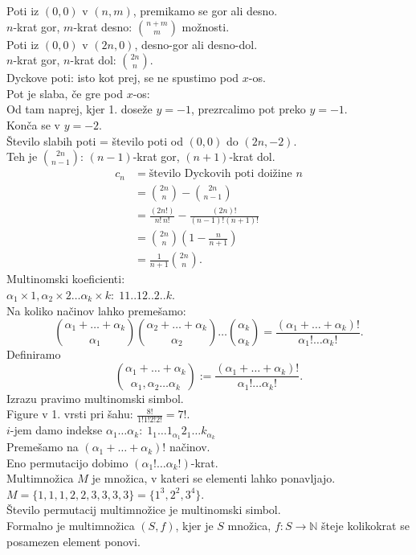 \documentclass[a4paper, 12pt]{book}
\theoremstyle{definition}
\theoremstyle{remark}
\newcommand{\N}{\mathbb{N}}
\begin{document}
Poti iz $(0,0)$ v $(n,m)$, premikamo se gor ali desno. \\
$n$-krat gor, $m$-krat desno: $\binom{n+m}{m}$ možnosti. \\
Poti iz $(0,0)$ v $(2n,0)$, desno-gor ali desno-dol. \\
$n$-krat gor, $n$-krat dol: $\binom{2n}{n}$. \\
Dyckove poti: isto kot prej, se ne spustimo pod $x$-os. \\
Pot je slaba, če gre pod $x$-os: \\
Od tam naprej, kjer 1. doseže $y=-1$, prezrcalimo pot preko $y=-1$. \\
Konča se v $y=-2$. \\
Število slabih poti = število poti od $(0,0)$ do $(2n,-2)$. \\
Teh je $\binom{2n}{n-1}$: $(n-1)$-krat gor, $(n+1)$-krat dol. \\
\begin{align*}
  c_n &= \text{število Dyckovih poti doižine } n \\
  &= \binom{2n}{n} - \binom{2n}{n-1} \\
  &= \frac{(2n!)}{n! \, n!} - \frac{(2n)!}{(n-1)!(n+1)!} \\
  &= \binom{2n}{n}(1 - \frac{n}{n+1}) \\
  &= \frac{1}{n+1} \binom{2n}{n}.
\end{align*}
Multinomski koeficienti: \\
$\alpha_1 \times 1, \alpha_2 \times 2 \dots \alpha_k \times k: \; 11..12..2..k$. \\
Na koliko načinov lahko premešamo:
\begin{equation*}
  \binom{\alpha_1 + \dots + \alpha_k}{\alpha_1} \binom{\alpha_2 + \dots + \alpha_k}{\alpha_2} \dots
  \binom{\alpha_k}{\alpha_k} =
  \frac{(\alpha_1 + \dots + \alpha_k)!}{\alpha_1! \dots \alpha_k!}.
\end{equation*}
Definiramo
\begin{equation}
  \label{multinomski}
  \binom{\alpha_1 + \dots + \alpha_k}{\alpha_1, \alpha_2 \dots \alpha_k} := \frac{(\alpha_1 + \dots + \alpha_k)!}{\alpha_1! \dots \alpha_k!}.
\end{equation}
Izrazu  pravimo multinomski simbol. \\
Figure v 1. vrsti pri šahu: $\frac{8!}{1!1!2!2!} = 7!$. \\
$i$-jem damo indekse $\alpha_1 \dots \alpha_k: \; 1_1 \dots 1_{\alpha_1} 2_1 \dots k_{\alpha_k}$ \\
Premešamo na $(\alpha_1 + \dots + \alpha_k)!$ načinov. \\
Eno permutacijo dobimo $(\alpha_1! \dots \alpha_k!)$-krat. \\
Multimnožica $M$ je množica, v kateri se elementi lahko ponavljajo. \\
$M = \{1, 1, 1, 2, 2, 3, 3, 3, 3\} = \{1^3, 2^2, 3^4\}$. \\
Število permutacij multimnožice je multinomski simbol. \\
Formalno je multimnožica $(S,f)$, kjer je $S$ množica, $f: S \to \N$ šteje kolikokrat se posamezen element ponovi.
\end{document}
